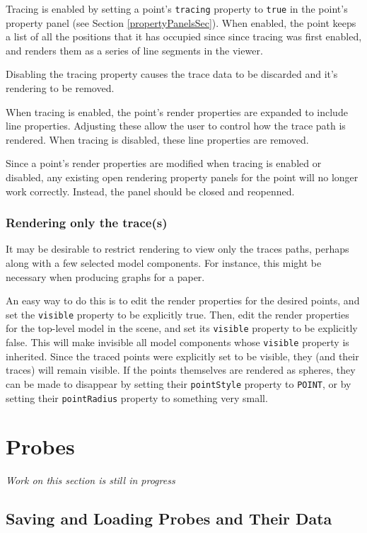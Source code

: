\documentclass{article}
\begin{document}
Tracing is enabled by setting a point's {\tt tracing} property to 
{\tt true} in the point's property panel (see Section \ref{propertyPanelsSec}).
When enabled, the point keeps a list of all the positions that it has
occupied since since tracing was first enabled, and renders them as a
series of line segments in the viewer.

Disabling the tracing property causes the trace data to be discarded
and it's rendering to be removed.

When tracing is enabled, the point's render properties are expanded to
include line properties. Adjusting these allow the user to control how
the trace path is rendered. When tracing is disabled, these line
properties are removed.

Since a point's render properties are modified when tracing is enabled
or disabled, any existing open rendering property panels for the
point will no longer work correctly. Instead, the panel should be
closed and reopenned.

\subsubsection{Rendering only the trace(s)}

It may be desirable to restrict rendering to view only the traces
paths, perhaps along with a few selected model components. For
instance, this might be necessary when producing graphs for a paper.

An easy way to do this is to edit the render properties for the
desired points, and set the {\tt visible} property to be explicitly
true. Then, edit the render properties for the top-level model in the
scene, and set its {\tt visible} property to be explicitly false.
This will make invisible all model components whose {\tt visible}
property is inherited. Since the traced points were explicitly set to
be visible, they (and their traces) will remain visible. If the points
themselves are rendered as spheres, they can be made to disappear by
setting their {\tt pointStyle} property to {\tt POINT}, or by setting
their {\tt pointRadius} property to something very small.

\section{Probes}

{\it Work on this section is still in progress}

\subsection{Saving and Loading Probes and Their Data}
\label{savingAndLoadingProbesSec}
\end{document}
